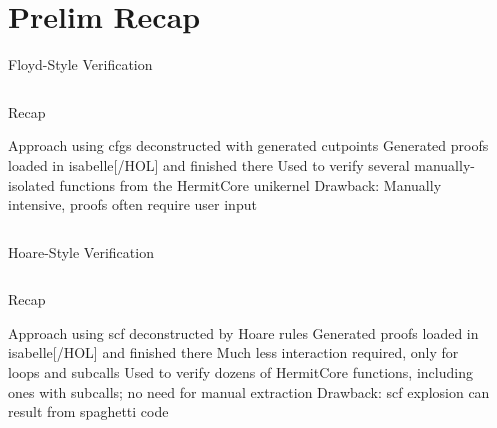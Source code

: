 \section{Prelim Recap}
\begin{frame}[label=floyd]{Floyd-Style Verification}
  \begin{columns}
    \begin{block}{Recap}
      \begin{outline}
        \1 Approach using \glspl{cfg} deconstructed with generated \alert{cutpoints}
        \1 Generated proofs loaded in \gls{isabelle}[/HOL] and finished there
        \1 Used to verify several manually-isolated functions from \alert{the HermitCore unikernel}
        \1 Drawback: Manually intensive, proofs often require user input
      \end{outline}
    \end{block}

    \begin{example}
    \end{example}
  \end{columns}
\end{frame}

\begin{frame}[label=hoare]{Hoare-Style Verification}
  \begin{columns}
    \begin{block}{Recap}
      \begin{outline}
        \1 Approach using \gls{scf} deconstructed by \alert{Hoare rules}
        \1 Generated proofs loaded in \gls{isabelle}[/HOL] and finished there
        \2 Much less interaction required, only for loops and subcalls
        \1 Used to verify dozens of HermitCore functions, including ones with subcalls; no need for manual extraction
        \1 Drawback: \gls{scf} explosion can result from spaghetti code
      \end{outline}
    \end{block}

    \begin{example}
    \end{example}
  \end{columns}
\end{frame}

